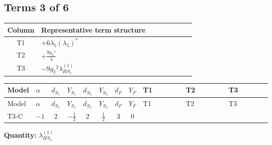 \documentclass[8pt]{article}
\begin{document}
\begin{landscape}
\subsection*{Terms 3 of 6}
\begin{center}
\begin{tabular}{@{}c >{\raggedright\arraybackslash}p{0.82\linewidth}@{}}
\toprule
Column & Representative term structure \\
\midrule
T1 & \(\displaystyle +6 {\lambda_5} \left({\lambda_5}\right)^{*}\) \\
\midrule
T2 & \(\displaystyle +\frac{9 {g_2}^4}{4}\) \\
\midrule
T3 & \(\displaystyle -9 {g_2}^2 {\lambda_{HS_2}^{(1)}}\) \\
\midrule
\bottomrule
\end{tabular}
\end{center}
\smallskip
\tiny
\begin{longtable}{@{}llcccccc >{\raggedright\arraybackslash}p{0.21\linewidth} >{\raggedright\arraybackslash}p{0.21\linewidth} >{\raggedright\arraybackslash}p{0.21\linewidth}@{}}
\toprule
Model & $\alpha$ & $d_{S_1}$ & $Y_{S_1}$ & $d_{S_2}$ & $Y_{S_2}$ & $d_F$ & $Y_F$ & T1 & T2 & T3 \\
\midrule
\endfirsthead
\toprule
Model & $\alpha$ & $d_{S_1}$ & $Y_{S_1}$ & $d_{S_2}$ & $Y_{S_2}$ & $d_F$ & $Y_F$ & T1 & T2 & T3 \\
\midrule
\endhead
T3-C & $-1$ & $2$ & $-\frac{1}{2}$ & $2$ & $\frac{1}{2}$ & $3$ & $0$ & \scriptsize\adjustbox{max width=\linewidth}{$\begin{gathered} +6 {\lambda_5} \left({\lambda_5}\right)^{*}\end{gathered}$} & \scriptsize\adjustbox{max width=\linewidth}{$\begin{gathered} +\frac{9 {g_2}^4}{4}\end{gathered}$} & \scriptsize\adjustbox{max width=\linewidth}{$\begin{gathered} -9 {g_2}^2 {\lambda_{HS_2}^{(1)}}\end{gathered}$} \\
\midrule
\bottomrule
\end{longtable}
\clearpage
\noindent\textbf{Quantity: }$\lambda_{HS_2}^{(1)}$\par\smallskip

\end{landscape}
\end{document}
